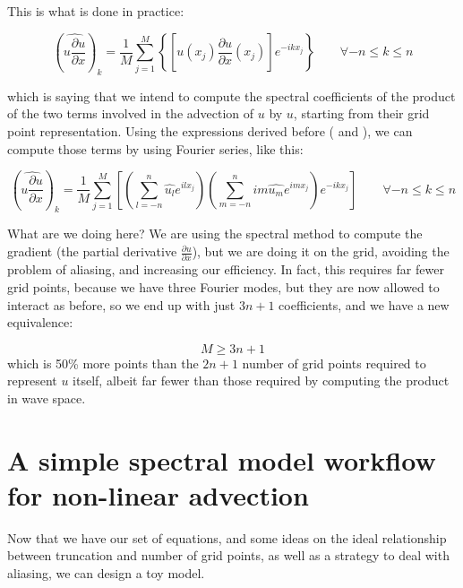 This is what is done in practice:

\begin{equation}
	\left( \widehat{u   \frac{\partial u}{\partial x}} \right) _k  =  \frac{1}{M}  \sum_{j=1}^{M}  \left\{  \left[ u (x_j) \frac{\partial u}{\partial x} (x_j) \right]   e^{-ikx_j}       \right\}  \qquad  \forall -n \le k \le n
	\label{spectral_on_grid1}
\end{equation}

which is saying that we intend to compute the spectral coefficients of the product of the two terms involved in the advection of $u$ by $u$, starting from their grid point representation. Using the expressions derived before (   and   ), we can compute those terms by using Fourier series, like this:

\begin{equation}
	\left( \widehat{u   \frac{\partial u}{\partial x}} \right) _k  =  \frac{1}{M}  \sum_{j=1}^{M}  
	\left[  \left( \sum_{l=-n}^{n}  \widehat{u_l} e^{ilx_j} \right)    \left(  \sum_{m=-n}^{n} 	im \widehat{u_m} e^{imx_j} \right) e^{-ikx_j}       
	\right]  \qquad  \forall -n \le k \le n
	\label{spectral_on_grid2}
\end{equation}

What are we doing here? We are using the spectral method to compute the gradient (the partial derivative $\frac{\partial u}{\partial x}$), but we are doing it on the grid, avoiding the problem of aliasing, and increasing our efficiency. In fact, this requires far fewer grid points, because we have three Fourier modes, but they are now allowed to interact as before, so we end up with just $3n+1$ coefficients, and we have a new equivalence:

\begin{definition}
	\begin{equation}
		M \ge 3n+1
	\end{equation}
	which is 50\% more points than the $2n+1$ number of grid points required to represent $u$ itself, albeit far fewer than those required by computing the product in wave space.
	\end{definition}

\section{A simple spectral model workflow for non-linear advection}
Now that we have our set of equations, and some ideas on the ideal relationship between truncation and number of grid points, as well as a strategy to deal with aliasing, we can design a toy model.

